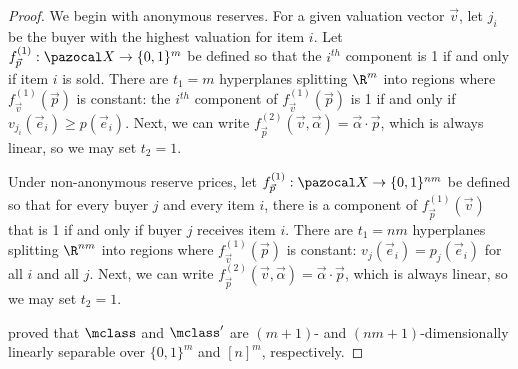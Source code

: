 \begin{proof}
We begin with anonymous reserves. For a given valuation vector $\vec{v}$, let $j_i$ be the buyer with the highest valuation for item $i$. Let $f_{\vec{p}}^{(1)}: \domain \to \{0,1\}^m$ be defined so that the $i^{th}$ component is 1 if and only if item $i$ is sold. There are $t_1 = m$ hyperplanes splitting $\R^m$ into regions where $f_{\vec{v}}^{(1)}(\vec{p})$ is constant: the $i^{th}$ component of $f_{\vec{v}}^{(1)}(\vec{p})$ is 1 if and only if $v_{j_i}(\vec{e}_i) \geq p(\vec{e}_i)$. Next, we can write $f_{\vec{p}}^{(2)}(\vec{v}, \vec{\alpha}) = \vec{\alpha} \cdot \vec{p}$, which is always linear, so we may set $t_2 = 1$.

Under non-anonymous reserve prices, let $f_{\vec{p}}^{(1)}: \domain \to \{0,1\}^{nm}$ be defined so that for every buyer $j$ and every item $i$, there is a component of $f_{\vec{p}}^{(1)}(\vec{v})$ that is 1 if and only if buyer $j$ receives item $i$. There are $t_1 = nm$ hyperplanes splitting $\R^{nm}$ into regions where $f_{\vec{v}}^{(1)}(\vec{p})$ is constant: $v_{j}(\vec{e}_i) = p_{j}(\vec{e}_i)$ for all $i$ and all $j$. Next, we can write $f_{\vec{p}}^{(2)}(\vec{v}, \vec{\alpha}) = \vec{\alpha} \cdot \vec{p}$, which is always linear, so we may set $t_2 = 1$.

\citet{Morgenstern16:Learning} proved that $\mclass$ and $\mclass'$ are $(m+1)$- and $(nm+1)$-dimensionally linearly separable over $\{0,1\}^m$ and $[n]^m$, respectively.
\end{proof}